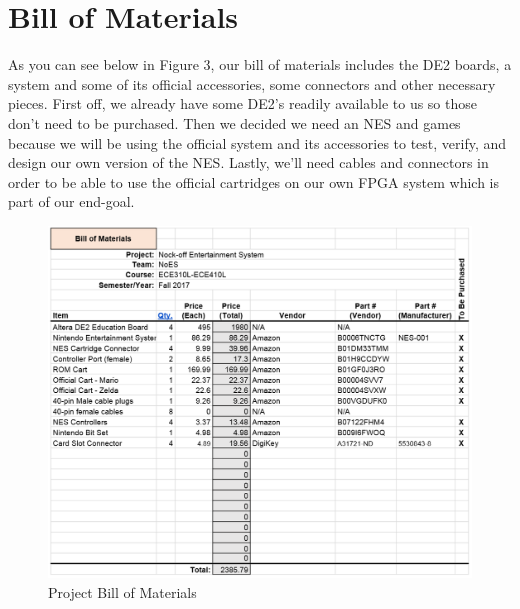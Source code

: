 \documentclass[a4paper]{article}
\begin{document}
\section{Bill of Materials}
As you can see below in Figure 3, our bill of materials includes the DE2 boards, a system and some of its official accessories, some connectors and other necessary pieces. First off, we already have some DE2's readily available to us so those don't need to be purchased. Then we decided we need an NES and games because we will be using the official system and its accessories to test, verify, and design our own version of the NES. Lastly, we'll need cables and connectors in order to be able to use the official cartridges on our own FPGA system which is part of our end-goal. 
\begin{figure}[H]
\centering
\includegraphics[width=\textwidth]{bom.png}
\caption{\label{fig:Table}Project Bill of Materials}
\end{figure}


\end{document}
